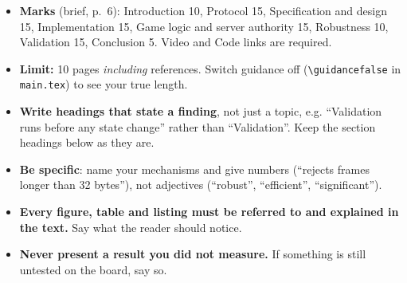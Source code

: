 \documentclass[conference]{IEEEtran}
\newif\ifguidance
\newenvironment{guidance}[1][Guidance]
  {\ifguidance\begin{guidebox}[#1]\else\setbox0\vbox\bgroup\fi}
  {\ifguidance\end{guidebox}\else\egroup\fi}
\begin{document}
\begin{guidance}[Before you start writing]
\begin{itemize}\setlength\itemsep{0pt}
\item \textbf{Marks} (brief, p.~6): Introduction 10, Protocol 15, Specification
  and design 15, Implementation 15, Game logic and server authority 15,
  Robustness 10, Validation 15, Conclusion 5. Video and Code links are required.
\item \textbf{Limit:} 10 pages \emph{including} references. Switch guidance off
  (\texttt{\textbackslash guidancefalse} in \texttt{main.tex}) to see your true length.
\item \textbf{Write headings that state a finding}, not just a topic, e.g.
  ``Validation runs before any state change'' rather than ``Validation''.
  Keep the section headings below as they are.
\item \textbf{Be specific}: name your mechanisms and give numbers
  (``rejects frames longer than 32 bytes''), not adjectives (``robust'',
  ``efficient'', ``significant'').
\item \textbf{Every figure, table and listing must be referred to and explained
  in the text.} Say what the reader should notice.
\item \textbf{Never present a result you did not measure.} If something is still
  untested on the board, say so.
\end{itemize}
\end{guidance}













\end{document}
